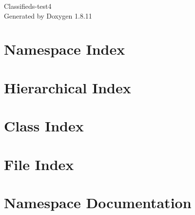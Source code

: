\documentclass[twoside]{book}
\newcommand{\+}{\discretionary{\mbox{\scriptsize$\hookleftarrow$}}{}{}}
\newcommand{\clearemptydoublepage}{%
  \newpage{\pagestyle{empty}\cleardoublepage}%
}
\begin{document}
\hypersetup{pageanchor=false,
             bookmarksnumbered=true,
             pdfencoding=unicode
            }
\begin{titlepage}
\vspace*{7cm}
\begin{center}%
{\Large Classifieds-\/test4 }\\
\vspace*{1cm}
{\large Generated by Doxygen 1.8.11}\\
\end{center}
\end{titlepage}
\clearemptydoublepage
\tableofcontents
\clearemptydoublepage
{}
\hypersetup{pageanchor=true}

\chapter{Namespace Index}

\chapter{Hierarchical Index}

\chapter{Class Index}

\chapter{File Index}

\chapter{Namespace Documentation}









\end{document}
